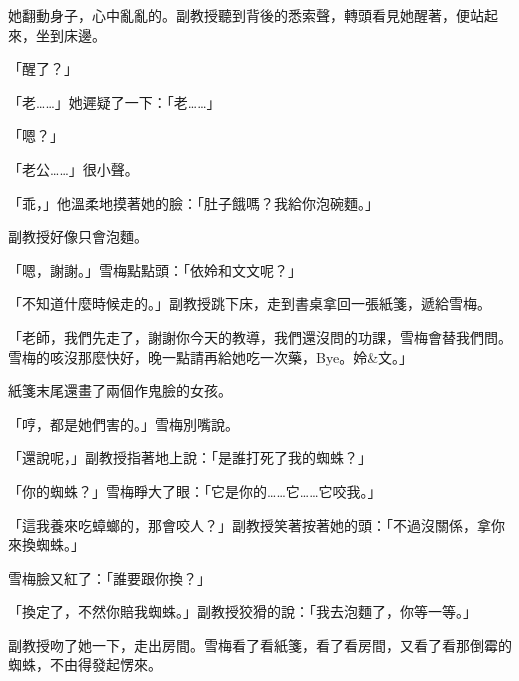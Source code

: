 她翻動身子，心中亂亂的。副教授聽到背後的悉索聲，轉頭看見她醒著，便站起來，坐到床邊。

「醒了？」

「老……」她遲疑了一下：「老……」

「嗯？」

「老公……」很小聲。

「乖，」他溫柔地摸著她的臉：「肚子餓嗎？我給你泡碗麵。」

副教授好像只會泡麵。

「嗯，謝謝。」雪梅點點頭：「依姈和文文呢？」

「不知道什麼時候走的。」副教授跳下床，走到書桌拿回一張紙箋，遞給雪梅。

「老師，我們先走了，謝謝你今天的教導，我們還沒問的功課，雪梅會替我們問。雪梅的咳沒那麼快好，晚一點請再給她吃一次藥，Bye。姈\&文。」

紙箋末尾還畫了兩個作鬼臉的女孩。

「哼，都是她們害的。」雪梅別嘴說。

「還說呢，」副教授指著地上說：「是誰打死了我的蜘蛛？」

「你的蜘蛛？」雪梅睜大了眼：「它是你的……它……它咬我。」

「這我養來吃蟑螂的，那會咬人？」副教授笑著按著她的頭：「不過沒關係，拿你來換蜘蛛。」

雪梅臉又紅了：「誰要跟你換？」

「換定了，不然你賠我蜘蛛。」副教授狡猾的說：「我去泡麵了，你等一等。」

副教授吻了她一下，走出房間。雪梅看了看紙箋，看了看房間，又看了看那倒霉的蜘蛛，不由得發起愣來。